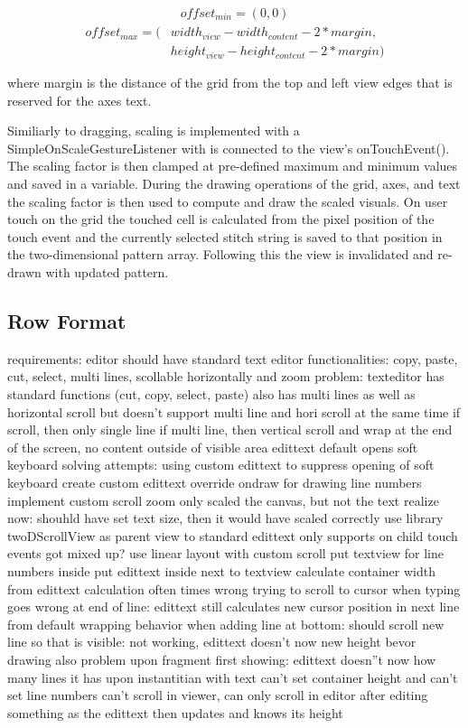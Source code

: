 \begin{gather*}
offset_{min} = (0, 0)
\end{gather*}
\begin{align*}
offset_{max} = (&width_{view} - width_{content} - 2 * margin, \\
				&height_{view} - height_{content} - 2 * margin)
\end{align*}

where margin is the distance of the grid from the top and left view edges that is reserved for the axes text.

Similiarly to dragging, scaling is implemented with a SimpleOnScaleGestureListener with is connected to the view's onTouchEvent(). The scaling factor is then clamped at pre-defined maximum and minimum values and saved in a variable. During the drawing operations of the grid, axes, and text the scaling factor is then used to compute and draw the scaled visuals. On user touch on the grid the touched cell is calculated from the pixel position of the touch event and the currently selected stitch string is saved to that position in the two-dimensional pattern array. Following this the view is invalidated and re-drawn with updated pattern.   

\subsection{Row Format}
\label{impl_row_format}


requirements: 
	editor should have standard text editor functionalities: copy, paste, cut, select, multi lines, scollable horizontally and zoom
problem:
	texteditor has standard functions (cut, copy, select, paste) 
	also has multi lines as well as horizontal scroll
	but doesn't support multi line and hori scroll at the same time
	if scroll, then only single line
	if multi line, then vertical scroll and wrap at the end of the screen, no content outside of visible area
	edittext default opens soft keyboard
solving attempts:
	using custom edittext to suppress opening of soft keyboard  
	create custom edittext 
		override ondraw for drawing line numbers
		implement custom scroll
		zoom only scaled the canvas, but not the text
		realize now: shouhld have set text size, then it would have scaled correctly
	use library twoDScrollView as parent view to standard edittext
		only supports on child
		touch events got mixed up?
	use linear layout with custom scroll
		put textview for line numbers inside
		put edittext inside next to textview
		calculate container width from edittext
		calculation often times wrong
		trying to scroll to cursor when typing goes wrong at end of line: edittext still calculates new cursor position in next line from default wrapping behavior
		when adding line at bottom: should scroll new line so that is visible: not working, edittext doesn't now new height bevor drawing
		also problem upon fragment first showing: edittext doesn''t now how many lines it has upon instantitian with text 
		can't set container height and can't set line numbers
		can't scroll in viewer, can only scroll in editor after editing something as the edittext then updates and knows its height

